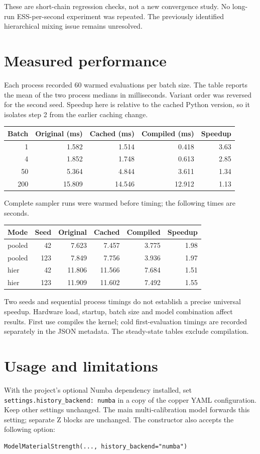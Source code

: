 \documentclass[11pt]{article}
\begin{document}
These are short-chain regression checks, not a new convergence study. No
long-run ESS-per-second experiment was repeated. The previously identified
hierarchical mixing issue remains unresolved.
\section*{Measured performance}
Each process recorded 60 warmed evaluations per batch size. The table reports
the mean of the two process medians in milliseconds. Variant order was reversed
for the second seed. Speedup here is relative to the cached Python version,
so it isolates step 2 from the earlier caching change.
\begin{center}\begin{tabular}{rrrrr}\toprule
Batch & Original (ms) & Cached (ms) & Compiled (ms) & Speedup\\\midrule
1 & 1.582 & 1.514 & 0.418 & 3.63\\
4 & 1.852 & 1.748 & 0.613 & 2.85\\
50 & 5.364 & 4.844 & 3.611 & 1.34\\
200 & 15.809 & 14.546 & 12.912 & 1.13\\
\bottomrule\end{tabular}\end{center}
Complete sampler runs were warmed before timing; the following times are seconds.
\begin{center}\begin{tabular}{lrrrrr}\toprule
Mode & Seed & Original & Cached & Compiled & Speedup\\\midrule
pooled & 42 & 7.623 & 7.457 & 3.775 & 1.98\\
pooled & 123 & 7.849 & 7.756 & 3.936 & 1.97\\
hier & 42 & 11.806 & 11.566 & 7.684 & 1.51\\
hier & 123 & 11.909 & 11.602 & 7.492 & 1.55\\
\bottomrule\end{tabular}\end{center}
Two seeds and sequential process timings do not establish a precise universal
speedup. Hardware load, startup, batch size and model combination affect results.
First use compiles the kernel; cold first-evaluation timings are recorded
separately in the JSON metadata. The steady-state tables exclude compilation.
\section*{Usage and limitations}
With the project's optional Numba dependency installed, set
\texttt{settings.history\_backend: numba} in a copy of the copper YAML
configuration. Keep other settings unchanged. The main multi-calibration model
forwards this setting; separate Z blocks are unchanged. The constructor also
accepts the following option:
\begin{verbatim}
ModelMaterialStrength(..., history_backend="numba")
\end{verbatim}
\end{document}
